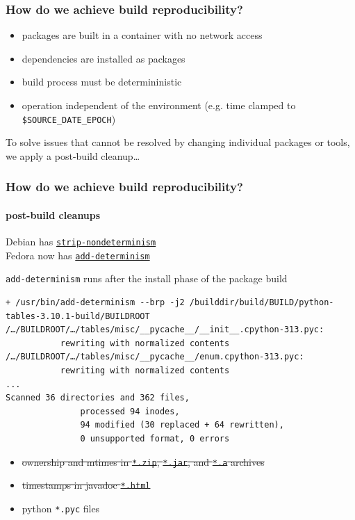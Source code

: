 \documentclass[]{beamer}
\begin{document}
\begin{frame}
  \frametitle{How do we achieve build reproducibility?}

  \pause

  \begin{itemize}
  \item packages are built in a container with no network access
  \item dependencies are installed as packages
  \item build process must be determininistic
  \item operation independent of the environment (e.g. time clamped to \texttt{\$SOURCE\_DATE\_EPOCH})
  \end{itemize}

  \vfill
  \pause

  To solve issues that cannot be resolved by changing individual packages
  or tools, we apply a post-build cleanup…
\end{frame}

\begin{frame}[fragile]
  \frametitle{How do we achieve build reproducibility?}
  \framesubtitle{post-build cleanups}

  \pause

  Debian has \href{https://packages.debian.org/sid/dh-strip-nondeterminism}{\texttt{strip-nondeterminism}}\\
  Fedora now has \href{https://github.com/keszybz/add-determinism}{\texttt{add-determinism}}\\

  \vfill
  \pause

  \texttt{add-determinism} runs after the install phase of the package build

  {\tiny
  \begin{verbatim}
+ /usr/bin/add-determinism --brp -j2 /builddir/build/BUILD/python-tables-3.10.1-build/BUILDROOT    
/…/BUILDROOT/…/tables/misc/__pycache__/__init__.cpython-313.pyc:
           rewriting with normalized contents
/…/BUILDROOT/…/tables/misc/__pycache__/enum.cpython-313.pyc:
           rewriting with normalized contents
...
Scanned 36 directories and 362 files,
               processed 94 inodes,
               94 modified (30 replaced + 64 rewritten),
               0 unsupported format, 0 errors
  \end{verbatim}
  }

  \vfill
  \pause

  \begin{itemize}
  \item \sout{ownership and mtimes in \texttt{*.zip}, \texttt{*.jar}, and \texttt{*.a} archives}
  \item \sout{timestamps in javadoc \texttt{*.html}}
  \item python \texttt{*.pyc} files
  \end{itemize}
\end{frame}
\end{document}
